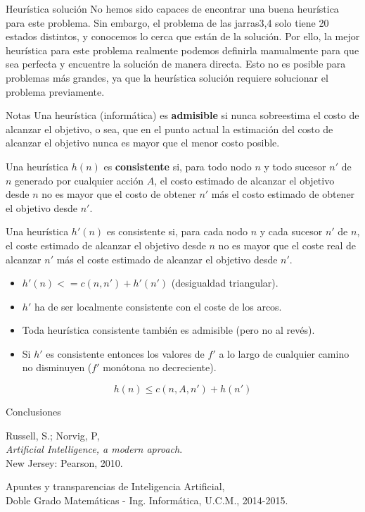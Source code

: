 \documentclass[11pt, a4paper, spanish, openright, twoside]{book}
\begin{document}
\begin{section}{Heurística solución }
No hemos sido capaces de encontrar una buena heurística para este problema. Sin embargo, el problema de las jarras3,4 solo tiene 20 estados distintos, y conocemos lo cerca que están de la solución.
Por ello, la mejor heurística para este problema realmente podemos definirla manualmente para que sea perfecta y encuentre la solución de manera directa. Esto no es posible para problemas más grandes, 
ya que la heurística solución requiere solucionar el problema previamente.

\end{section}

\begin{section}{Notas}
	Una heurística (informática) es \textbf{admisible} si nunca sobreestima el costo de alcanzar el objetivo, o sea, 
que en el punto actual la estimación del costo de alcanzar el objetivo nunca es mayor que el menor costo posible.

	Una heurística $h(n)$ es \textbf{consistente} si, para todo nodo $n$ y todo sucesor $n'$ de $n$ generado por cualquier acción $A$, el costo estimado de alcanzar el objetivo desde $n$ no es mayor que el costo de obtener $n'$ más el costo estimado de obtener el objetivo desde $n'$.

	Una heurística $h'(n)$ es consistente si, para cada nodo $n$ y cada sucesor $n'$ de $n$, el coste 
	estimado de alcanzar el objetivo desde $n$ no es mayor que el coste real de 
	alcanzar $n'$ más el coste estimado de alcanzar el objetivo desde $n'$.
		\begin{itemize}
		\item  $h'(n) <= c(n, n') + h'(n')$ (desigualdad triangular).
		\item  $h'$  ha de ser localmente consistente con el coste de los arcos.
		\item Toda heurística consistente también es admisible (pero no al revés).
		\item Si $h'$ es consistente entonces los valores de $f'$ a lo largo de cualquier 
		camino no disminuyen ($f'$ monótona no decreciente).
		\end{itemize}

$$\boxed{h(n) \le c(n, A, n') + h(n')}$$
\end{section}

\begin{section}{Conclusiones}
	
	
	
\end{section}

\begin{thebibliography}{9}

	Russell, S.; Norvig, P, \\
	\emph{Artificial Intelligence, a modern aproach}.\\
	New Jersey: Pearson, 2010.
	
	Apuntes y transparencias de Inteligencia Artificial, \\
	Doble Grado Matemáticas - Ing. Informática, U.C.M., 2014-2015.

\end{thebibliography}
\end{document}
